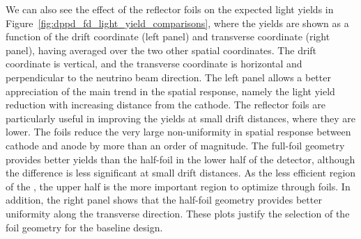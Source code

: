 We can also see the effect of the  reflector foils on the expected light yields in Figure~\ref{fig:dppd_fd_light_yield_comparisons}, where the yields are shown as a function of the drift coordinate (left panel) and transverse coordinate (right panel), having averaged over the two other spatial coordinates. The drift coordinate is vertical, and the transverse coordinate is horizontal and perpendicular to the neutrino beam direction. The left panel allows a better appreciation of the main trend in the spatial response, namely the light yield reduction with increasing distance from the cathode. 
The  reflector foils are particularly useful in improving the yields at small drift distances, where they are lower. The foils reduce the very large non-uniformity in spatial response between cathode and anode by more than an order of magnitude. The full-foil geometry provides better yields than the half-foil in the lower half of the detector, although the  difference is less significant at small drift distances.   
As the less efficient region of the ,
the upper half is the more important region to optimize through foils. 
 In addition, the right panel shows that the half-foil geometry provides better uniformity along the transverse direction. These plots justify the selection of the  foil geometry for the  baseline design. 

